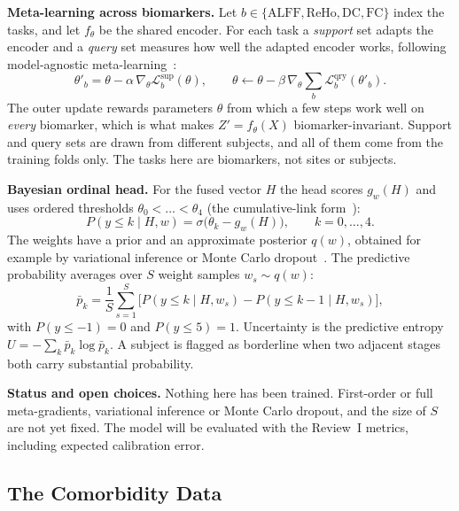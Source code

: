 \documentclass{ssnreview}
\begin{document}
\textbf{Meta-learning across biomarkers.} Let $b\in\{\mathrm{ALFF},\mathrm{ReHo},
\mathrm{DC},\mathrm{FC}\}$ index the tasks, and let $f_\theta$ be the shared encoder. For each
task a \emph{support} set adapts the encoder and a \emph{query} set measures how well
the adapted encoder works, following model-agnostic meta-learning~\cite{finn2017}:
\begin{equation}
  \theta'_b = \theta - \alpha\,\nabla_\theta \mathcal{L}^{\mathrm{sup}}_b(\theta),
  \qquad
  \theta \leftarrow \theta - \beta\,\nabla_\theta \sum_{b}\mathcal{L}^{\mathrm{qry}}_b(\theta'_b).
\end{equation}
The outer update rewards parameters $\theta$ from which a few steps work well on
\emph{every} biomarker, which is what makes $Z'=f_\theta(X)$ biomarker-invariant. Support
and query sets are drawn from different subjects, and all of them come from the training
folds only. The tasks here are biomarkers, not sites or subjects.

\textbf{Bayesian ordinal head.} For the fused vector $H$ the head scores
$g_w(H)$ and uses ordered thresholds $\theta_0<\dots<\theta_4$ (the cumulative-link
form~\cite{mccullagh1980}):
\begin{equation}
  P(y\le k\mid H,w)=\sigma\big(\theta_k-g_w(H)\big),\qquad k=0,\dots,4 .
\end{equation}
The weights have a prior and an approximate posterior $q(w)$, obtained for example by
variational inference or Monte Carlo dropout~\cite{gal2016}. The predictive probability
averages over $S$ weight samples $w_s\sim q(w)$:
\begin{equation}
  \bar p_k=\frac1S\sum_{s=1}^{S}\Big[P(y\le k\mid H,w_s)-P(y\le k-1\mid H,w_s)\Big],
\end{equation}
with $P(y\le -1)=0$ and $P(y\le 5)=1$. Uncertainty is the predictive entropy
$U=-\sum_k \bar p_k\log\bar p_k$. A subject is flagged as borderline when two adjacent
stages both carry substantial probability.

\textbf{Status and open choices.} Nothing here has been trained. First-order or full
meta-gradients, variational inference or Monte Carlo dropout, and the size of $S$ are not
yet fixed. The model will be evaluated with the Review~I metrics, including expected
calibration error.

\subsection{The Comorbidity Data}\label{sec:comorb}
\end{document}
